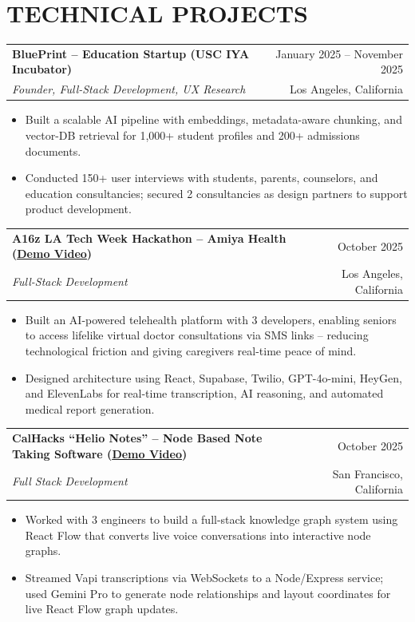 \documentclass[10pt, letterpaper]{article}
\makeatletter
\newcommand{\jobheader}[4]{%
  \begin{tabularx}{\textwidth}{@{}X r@{}}
    \textbf{#1} & #2 \\
    \textit{#3} & #4 \\
  \end{tabularx}%
  \vspace{1pt}%
}
\makeatother
\begin{document}
\section*{TECHNICAL PROJECTS}

\jobheader{BluePrint -- Education Startup (USC IYA Incubator)}{January 2025 -- November 2025}
          {Founder, Full-Stack Development, UX Research}{Los Angeles, California}
\begin{itemize}
  \item Built a scalable AI pipeline with embeddings, metadata-aware chunking, and vector-DB retrieval for 1,000+ student profiles and 200+ admissions documents.
  \item Conducted 150+ user interviews with students, parents, counselors, and education consultancies; secured 2 consultancies as design partners to support product development.
\end{itemize}

\vspace{4pt}

\jobheader{A16z LA Tech Week Hackathon -- Amiya Health (\href{https://youtu.be/vrwiLc0ROXk}{\underline{Demo Video}})}{October 2025}
          {Full-Stack Development}{Los Angeles, California}
\begin{itemize}
  \item Built an AI-powered telehealth platform with 3 developers, enabling seniors to access lifelike virtual doctor consultations via SMS links -- reducing technological friction and giving caregivers real-time peace of mind.
  \item Designed architecture using React, Supabase, Twilio, GPT-4o-mini, HeyGen, and ElevenLabs for real-time transcription, AI reasoning, and automated medical report generation.
\end{itemize}

\vspace{4pt}

\jobheader{CalHacks ``Helio Notes'' -- Node Based Note Taking Software (\href{https://youtu.be/m_2NIEZy6Js}{\underline{Demo Video}})}{October 2025}
          {Full Stack Development}{San Francisco, California}
\begin{itemize}
  \item Worked with 3 engineers to build a full-stack knowledge graph system using React Flow that converts live voice conversations into interactive node graphs.
  \item Streamed Vapi transcriptions via WebSockets to a Node/Express service; used Gemini Pro to generate node relationships and layout coordinates for live React Flow graph updates.
\end{itemize}
\end{document}
